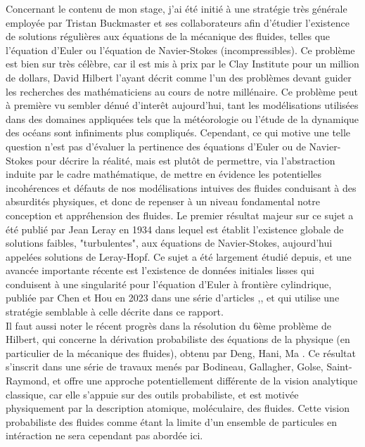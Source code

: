 \documentclass[11pt,a4paper]{article}
\begin{document}
Concernant le contenu de mon stage, j'ai été initié à une stratégie très générale employée par Tristan Buckmaster et ses collaborateurs afin d'étudier l'existence de solutions régulières aux équations de la mécanique des fluides, telles que l'équation d'Euler ou l'équation de Navier-Stokes (incompressibles). Ce problème est bien sur très célèbre, car il est mis à prix par le Clay Institute pour un million de dollars, David Hilbert l'ayant décrit comme l'un des problèmes devant guider les recherches des mathématiciens au cours de notre millénaire. Ce problème peut à première vu sembler dénué d'interêt aujourd'hui, tant les modélisations utilisées dans des domaines appliquées tels que la météorologie ou l'étude de la dynamique des océans sont infiniments plus compliqués. Cependant, ce qui motive une telle question n'est pas d'évaluer la pertinence des équations d'Euler ou de Navier-Stokes pour décrire la réalité, mais est plutôt de permettre, via l'abstraction induite par le cadre mathématique, de mettre en évidence les potentielles incohérences et défauts de nos modélisations intuives des fluides conduisant à des absurdités physiques, et donc de repenser à un niveau fondamental notre conception et appréhension des fluides. Le premier résultat majeur sur ce sujet a été publié par Jean Leray en 1934 \cite{leray1934} dans lequel est établit l'existence globale de solutions faibles, "turbulentes", aux équations de Navier-Stokes, aujourd'hui appelées solutions de Leray-Hopf. Ce sujet a été largement étudié depuis, et une avancée importante récente est l'existence de données initiales lisses qui conduisent à une singularité pour l'équation d'Euler à frontière cylindrique, publiée par Chen et Hou en 2023 dans une série d'articles \cite{chen_hou1},\cite{chen_hou2}, et qui utilise une stratégie semblable à celle décrite dans ce rapport. \\
Il faut aussi noter le récent progrès dans la résolution du 6ème problème de Hilbert, qui concerne la dérivation probabiliste des équations de la physique (en particulier de la mécanique des fluides), obtenu par Deng, Hani, Ma \cite{deng_hani_ma_2025_hilbert6}. Ce résultat s'inscrit dans une série de travaux menés par Bodineau, Gallagher, Golse, Saint-Raymond, et offre une approche potentiellement différente de la vision analytique classique, car elle s'appuie sur des outils probabiliste, et est motivée physiquement par la description atomique, moléculaire, des fluides. Cette vision probabiliste des fluides comme étant la limite d'un ensemble de particules en intéraction ne sera cependant pas abordée ici. \\
\end{document}
